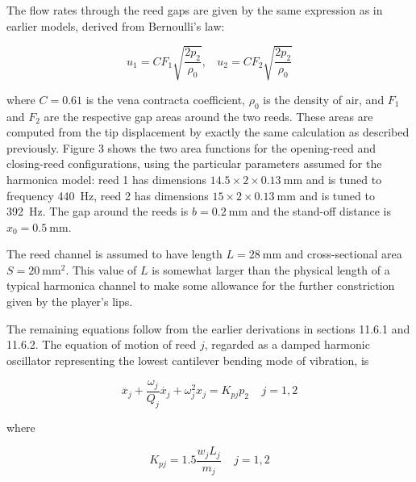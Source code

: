   The flow rates through the reed gaps are given by the same expression as in 
  earlier models, derived from Bernoulli's law: 

  \begin{equation*}u_1=CF_1 \sqrt{\dfrac{2p_2}{\rho_0}}, \mathrm{~~~~}u_2=CF_2 
  \sqrt{\dfrac{2p_2}{\rho_0}} \tag{3}\end{equation*} 

  \noindent{}where $C=0.61$ is the vena contracta coefficient, $\rho_0$ is the 
  density of air, and $F_1$ and $F_2$ are the respective gap areas around the 
  two reeds. These areas are computed from the tip displacement by exactly the 
  same calculation as described previously. Figure 3 shows the two area 
  functions for the opening-reed and closing-reed configurations, using the 
  particular parameters assumed for the harmonica model: reed 1 has dimensions 
  $14.5 \times 2 \times 0.13 \mathrm{~mm}$ and is tuned to frequency 440~Hz, 
  reed 2 has dimensions $15 \times 2 \times 0.13 \mathrm{~mm}$ and is tuned to 
  392~Hz. The gap around the reeds is $b=0.2 \mathrm{~mm}$ and the stand-off 
  distance is $x_0=0.5 \mathrm{~mm}$. 


  The reed channel is assumed to have length $L=28 \mathrm{~mm}$ and 
  cross-sectional area $S=20 \mathrm{~mm}^2$. This value of $L$ is somewhat 
  larger than the physical length of a typical harmonica channel to make some 
  allowance for the further constriction given by the player's lips. 

  The remaining equations follow from the earlier derivations in sections 
  11.6.1 and 11.6.2. The equation of motion of reed $j$, regarded as a damped 
  harmonic oscillator representing the lowest cantilever bending mode of 
  vibration, is 

  \begin{equation*}\ddot{x_j}+\dfrac{\omega_j}{Q_j} \dot{x_j} +\omega_j^2 x_j = 
  K_{pj} p_2 \mathrm{~~~~~} j=1,2 \tag{4}\end{equation*} 

  \noindent{}where 

  \begin{equation*}K_{pj} = 1.5 \dfrac{w_j L_j}{m_j} \mathrm{~~~~~} j=1,2 
  \tag{5}\end{equation*} 

